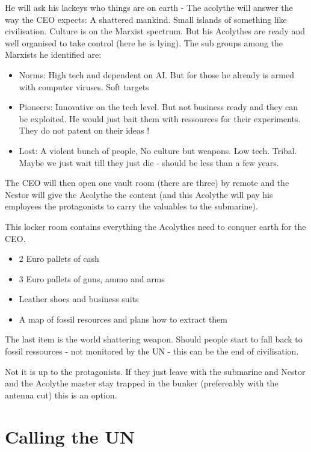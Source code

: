 He will ask his lackeys who things are on earth - The acolythe will answer the way the CEO expects: A shattered mankind. Small islands of something like civilisation. Culture is on the Marxist spectrum. But his Acolythes are ready and well organised to take control (here he is lying). The sub groups among the Marxists he identified are:

\begin{itemize}
    \item {Norms: High tech and dependent on AI. But for those he already is armed with computer viruses. Soft targets}
    \item {Pioneers: Innovative on the tech level. But not business ready and they can be exploited. He would just bait them with ressources for their experiments. They do not patent on their ideas !}
    \item {Lost: A violent bunch of people, No culture but weapons. Low tech. Tribal. Maybe we just wait till they just die -  should be less than a few years.}
\end{itemize}

The CEO will then open one vault room (there are three) by remote and the Nestor will give the Acolythe the content (and this Acolythe will pay his employees the protagonists to carry the valuables to the submarine).

This locker room contains everything the Acolythes need to conquer earth for the CEO.

\begin{itemize}
    \item {2 Euro pallets of cash}
    \item {3 Euro pallets of guns, ammo and arms}
    \item {Leather shoes and business suits}
    \item {A map of fossil resources and plans how to extract them}
\end{itemize}

The last item is the world shattering weapon. Should people start to fall back to fossil ressources - not monitored by the UN - this can be the end of civilisation.

Not it is up to the protagonists. If they just leave with the submarine and Nestor and the Acolythe master stay trapped in the bunker (prefereably with the antenna cut) this is an option.

\section{Calling the UN}

